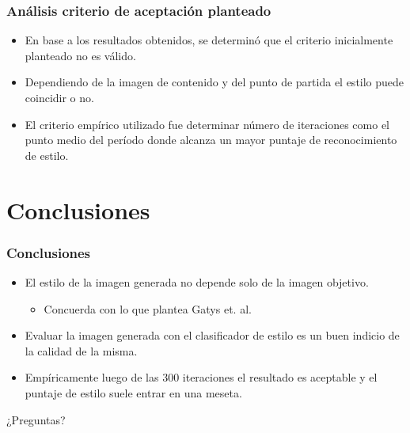 \documentclass[10pt,center]{beamer}
\begin{document}
\begin{frame}
  \frametitle{Análisis criterio de aceptación planteado}
  \begin{itemize}
    \item En base a los resultados obtenidos, se determinó que el criterio inicialmente planteado no es válido. \vspace{0.5cm}
    \item Dependiendo de la imagen de contenido y del punto de partida el estilo puede coincidir o no. \vspace{0.5cm}
    \item El criterio empírico utilizado fue determinar número de iteraciones como el punto medio del período donde alcanza un mayor puntaje de reconocimiento de estilo.
  \end{itemize}
\end{frame}

\section{Conclusiones}
\begin{frame}
  \frametitle{Conclusiones}
  \begin{itemize}
    \item El estilo de la imagen generada no depende solo de la imagen objetivo.
    \begin{itemize}
     \item Concuerda con lo que plantea Gatys et. al.
    \end{itemize}
    \vspace{0.5cm}
    \item Evaluar la imagen generada con el clasificador de estilo es un buen indicio de la calidad de la misma.
    \vspace{0.5cm}
    \item Empíricamente luego de las 300 iteraciones el resultado es aceptable y el puntaje de estilo suele entrar en una meseta.
  \end{itemize}

\end{frame}

\begin{frame}
  \vspace{1.5cm}
 {\Huge ¿Preguntas?}
\end{frame}
\end{document}
